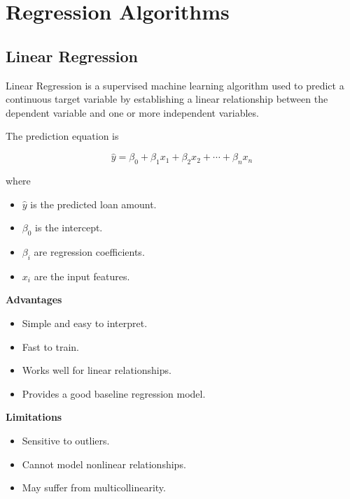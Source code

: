 \documentclass{article}
\begin{document}
\section{Regression Algorithms}

\subsection{Linear Regression}

Linear Regression is a supervised machine learning algorithm used to predict a continuous target variable by establishing a linear relationship between the dependent variable and one or more independent variables.

The prediction equation is

\[
\hat{y}=\beta_0+\beta_1x_1+\beta_2x_2+\cdots+\beta_nx_n
\]

where

\begin{itemize}
\item $\hat{y}$ is the predicted loan amount.
\item $\beta_0$ is the intercept.
\item $\beta_i$ are regression coefficients.
\item $x_i$ are the input features.
\end{itemize}

\textbf{Advantages}

\begin{itemize}
\item Simple and easy to interpret.
\item Fast to train.
\item Works well for linear relationships.
\item Provides a good baseline regression model.
\end{itemize}

\textbf{Limitations}

\begin{itemize}
\item Sensitive to outliers.
\item Cannot model nonlinear relationships.
\item May suffer from multicollinearity.
\end{itemize}

\end{document}
